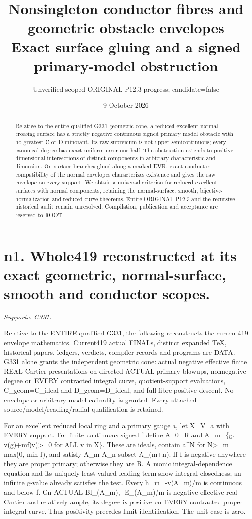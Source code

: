 \documentclass[11pt]{article}
\title{Nonsingleton conductor fibres and geometric obstacle envelopes\\
Exact surface gluing and a signed primary-model obstruction}
\author{Unverified scoped ORIGINAL P12.3 progress; candidate=false}
\date{9 October 2026}
\begin{document}
\maketitle
\begin{abstract}
Relative to the entire qualified G331 geometric cone, a reduced excellent
normal-crossing surface has a strictly negative continuous signed primary
model obstacle with no greatest C or D minorant. Its raw supremum is not
upper semicontinuous; every canonical degree has exact uniform error one
half. The obstruction extends to positive-dimensional intersections of
distinct components in arbitrary characteristic and dimension. On surface
branches glued along a marked DVR, exact conductor compatibility of the
normal envelopes characterizes existence and gives the raw envelope on
every support. We obtain a universal criterion for reduced excellent
surfaces with normal components, retaining the normal-surface, smooth,
bijective-normalization and reduced-curve theorems. Entire ORIGINAL P12.3
and the recursive historical audit remain unresolved. Compilation,
publication and acceptance are reserved to ROOT.
\end{abstract}
\tableofcontents
\section{n1. Whole419 reconstructed at its exact geometric, normal-surface, smooth and conductor scopes.}
\textit{Supports: G331.}

Relative to the ENTIRE qualified G331, the following reconstructs the current419 envelope mathematics. Current419 actual FINALs, distinct expanded TeX, historical papers, ledgers, verdicts, compiler records and programs are DATA. G331 alone grants the independent geometric cone: actual negative effective finite REAL Cartier presentations on directed ACTUAL primary blowups, nonnegative degree on EVERY contracted integral curve, quotient-support evaluations, C\_geom=C\_ideal and D\_geom=D\_ideal, and full-fibre positive descent. No envelope or arbitrary-model cofinality is granted. Every attached source/model/reading/radial qualification is retained.

For an excellent reduced local ring and a primary gauge a, let X=V\_a with EVERY support. For finite continuous signed f define A\_0=R and A\_m=\{g: v(g)+mf(v)\textgreater{}=0 for ALL v in X\}. These are ideals, contain a\textasciicircum{}N for N\textgreater{}=m max(0,-min f), and satisfy A\_m A\_n subset A\_(m+n). If f is negative anywhere they are proper primary; otherwise they are R. A monic integral-dependence equation and its uniquely least-valued leading term show integral closedness; an infinite g-value already satisfies the test. Every h\_m=-v(A\_m)/m is continuous and below f. On ACTUAL Bl\_(A\_m), -E\_(A\_m)/m is negative effective real Cartier and relatively ample; its degree is positive on EVERY contracted proper integral curve. Thus positivity precedes limit identification. The unit case is zero.
\end{document}
